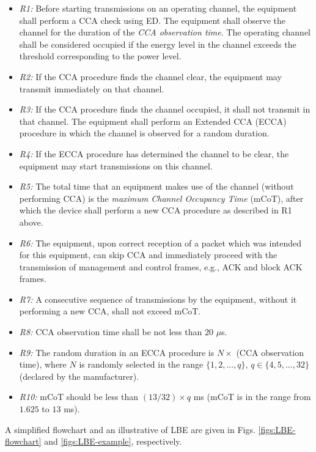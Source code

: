\begin{itemize}
	
	\item
	\textit{R1:} Before starting transmissions on an operating channel, the equipment shall perform a CCA check using ED. The equipment shall observe the channel for the duration of the \textit{CCA observation time}. The operating channel shall be considered occupied if the energy level in the channel exceeds the threshold corresponding to the power level.
	
	\item
	\textit{R2:}
	If the CCA procedure finds the channel clear, the equipment may transmit immediately on that channel.
	
	\item
	\textit{R3:}
	If the CCA procedure finds the channel occupied, it shall not transmit in that channel. The equipment shall perform an Extended CCA (ECCA) procedure in which the channel is observed for a random duration.
	
	\item
	\textit{R4:}
	If the ECCA procedure has determined the channel to be clear, the equipment may start transmissions on this channel.
	
	\item
	\textit{R5:}
	The total time that an equipment makes use of the channel (without performing CCA) is the \textit{maximum Channel Occupancy Time} (mCoT), after which the device shall perform a new CCA procedure as described in R1 above.
	
	\item
	\textit{R6:}
	The equipment, upon correct reception of a packet which was intended for this equipment, can skip CCA and immediately proceed with the transmission of management and control frames, e.g., ACK and block ACK frames.
	
	\item
	\textit{R7:}
	A consecutive sequence of transmissions by the equipment, without it performing a new CCA, shall not exceed mCoT.
	
	\item
	\textit{R8:}
	CCA observation time shall be not less than $20$ $\mu$s.
	
	\item
	\textit{R9:}
	The random duration in an ECCA procedure is $N \times$ (CCA observation time), where $N$ is randomly selected in the range $\{1,2,...,q\}$, $q \in \{4,5,...,32\}$ (declared by the manufacturer).
	
	\item
	\textit{R10:}
	mCoT should be less than $(13/32)\times q$ ms (mCoT is in the range from $1.625$ to $13$ ms).
	
\end{itemize}

A simplified flowchart and an illustrative of LBE are given in Figs. \ref{figs:LBE-flowchart} and \ref{figs:LBE-example}, respectively.


